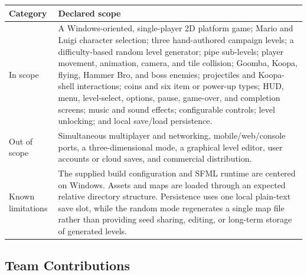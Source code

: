 \documentclass{template}
\begin{document}
\begin{tabularx}{\textwidth}{@{}p{}X@{}}
    \toprule
    \textbf{Category} & \textbf{Declared scope} \\
    \midrule
    In scope & A Windows-oriented, single-player 2D platform game; Mario and
    Luigi character selection; three hand-authored campaign levels; a
    difficulty-based random level generator; pipe sub-levels; player movement,
    animation, camera, and tile collision; Goomba, Koopa, flying, Hammer Bro,
    and boss enemies; projectiles and Koopa-shell interactions; coins and six
    item or power-up types; HUD, menu, level-select, options, pause, game-over,
    and completion screens; music and sound effects; configurable controls;
    level unlocking; and local save/load persistence. \\
    Out of scope & Simultaneous multiplayer and networking, mobile/web/console
    ports, a three-dimensional mode, a graphical level editor, user accounts or
    cloud saves, and commercial distribution. \\
    Known limitations & The supplied build configuration and SFML runtime are
    centered on Windows. Assets and maps are loaded through an expected
    relative directory structure. Persistence uses one local plain-text save
    slot, while the random mode regenerates a single map file rather than
    providing seed sharing, editing, or long-term storage of generated levels. \\
    \bottomrule
\end{tabularx}

\subsection{Team Contributions}
\end{document}
